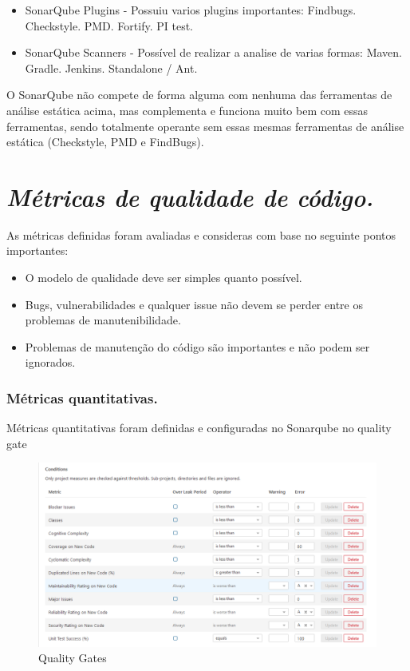 \documentclass[12pt]{article}
\begin{document}
\begin{itemize}
 \item SonarQube Plugins - Possuiu varios plugins importantes:
  \subitem Findbugs.
	\subitem Checkstyle.
	\subitem PMD.
	\subitem Fortify.
	\subitem PI test.
 \item SonarQube Scanners - Possível de realizar a analise de varias formas:
	\subitem Maven\cite{MAVEN}.
	\subitem Gradle\cite{GRADLE}.
	\subitem Jenkins\cite{JENKINS}.
	\subitem Standalone / Ant\cite{ANT}.
\end{itemize} 

O SonarQube não compete de forma alguma com nenhuma das ferramentas de análise estática acima, mas complementa e funciona muito bem com essas ferramentas, sendo totalmente operante sem essas mesmas ferramentas de análise estática (Checkstyle, PMD e FindBugs).

\section{\textit{Métricas de qualidade de código.}} \label{sec:managecodequality}

As métricas definidas foram avaliadas e consideras com base no seguinte pontos importantes:

 \begin{itemize}
 	\item O modelo de qualidade deve ser simples quanto possível.
 	\item Bugs, vulnerabilidades e qualquer issue não devem se perder entre os problemas de manutenibilidade.
 	\item Problemas de manutenção do código são importantes e não podem ser ignorados.
 \end{itemize}

\subsubsection{Métricas quantitativas.} \label{sec:sonar-planning-mquantity}

Métricas quantitativas foram definidas e configuradas no Sonarqube no quality gate \cite{SONAR_QUALITY_GATE}

\begin{figure}[H]
	\centering
		\includegraphics[scale=0.5]{img/sonar-quality-gates.png}
	\caption{Quality Gates}
	\label{fig:sonar-quality-gates}
\end{figure}
\end{document}
